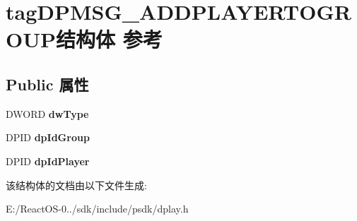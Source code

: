 \hypertarget{structtag_d_p_m_s_g___a_d_d_p_l_a_y_e_r_t_o_g_r_o_u_p}{}\section{tag\+D\+P\+M\+S\+G\+\_\+\+A\+D\+D\+P\+L\+A\+Y\+E\+R\+T\+O\+G\+R\+O\+U\+P结构体 参考}
\label{structtag_d_p_m_s_g___a_d_d_p_l_a_y_e_r_t_o_g_r_o_u_p}
\subsection*{Public 属性}
\begin{DoxyCompactItemize}
\item 
\mbox{\label{structtag_d_p_m_s_g___a_d_d_p_l_a_y_e_r_t_o_g_r_o_u_p_a2c0787574e02ddc9130a163f9d2dd07f}} 
D\+W\+O\+RD {\bfseries dw\+Type}
\item 
\mbox{\label{structtag_d_p_m_s_g___a_d_d_p_l_a_y_e_r_t_o_g_r_o_u_p_a871ff67bf5982616232f52f441c22944}} 
D\+P\+ID {\bfseries dp\+Id\+Group}
\item 
\mbox{\label{structtag_d_p_m_s_g___a_d_d_p_l_a_y_e_r_t_o_g_r_o_u_p_a1358277a6e587625695fd4297bac8634}} 
D\+P\+ID {\bfseries dp\+Id\+Player}
\end{DoxyCompactItemize}


该结构体的文档由以下文件生成\+:\begin{DoxyCompactItemize}
\item 
E\+:/\+React\+O\+S-\/0../sdk/include/psdk/dplay.\+h\end{DoxyCompactItemize}
